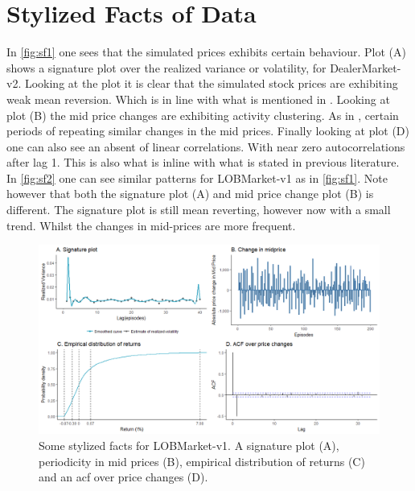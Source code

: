 \documentclass{kththesis}
\theoremstyle{definition}
\begin{document}
\section{Stylized Facts of Data}
In \autoref{fig:sf1} one sees that the simulated prices exhibits certain behaviour. Plot (A) shows a signature plot over the realized variance or volatility, for DealerMarket-v2. Looking at the plot it is clear that the simulated stock prices are exhibiting weak mean reversion. Which is in line with what is mentioned in \parencite{bouchaud2018trades}. Looking at plot (B) the mid price changes are exhibiting activity clustering. As in \parencite{bouchaud2018trades}, certain periods of repeating similar changes in the mid prices.
\newline
\newline
Finally looking at plot (D) one can also see an absent of linear correlations. With near zero autocorrelations after lag 1. This is also what is inline with what is stated in previous literature. In \autoref{fig:sf2} one can see similar patterns for LOBMarket-v1 as in \autoref{fig:sf1}. Note however that both the signature plot (A) and mid price change plot (B) is different. The signature plot is still mean reverting, however now with a small trend. Whilst the changes in mid-prices are more frequent. 
\begin{figure}[H]
		\centering
		\includegraphics[scale=.5]{lobv1_sf_multi.png}
		\caption{Some stylized facts for LOBMarket-v1. A signature plot (A), periodicity in mid prices (B), empirical distribution of returns (C) and an acf over price changes (D). }
		\label{fig:sf2}
\end{figure}
\end{document}
